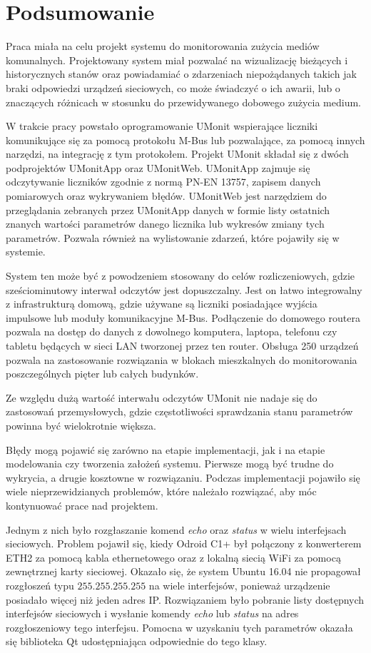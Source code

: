 \chapter{Podsumowanie} %
\label{cha:podsumowanie}

Praca miała na celu projekt systemu do monitorowania zużycia mediów komunalnych.
Projektowany system miał pozwalać na wizualizację bieżących i historycznych stanów oraz powiadamiać o zdarzeniach niepożądanych takich jak braki odpowiedzi urządzeń sieciowych, co może świadczyć o ich awarii, lub o znaczących różnicach w stosunku do przewidywanego dobowego zużycia medium.

W trakcie pracy powstało oprogramowanie UMonit wspierające liczniki komunikujące się za pomocą protokołu M-Bus lub pozwalające, za pomocą innych narzędzi, na integrację z tym protokołem.
Projekt UMonit składał się z dwóch podprojektów UMonitApp oraz UMonitWeb.
UMonitApp zajmuje się odczytywanie liczników zgodnie z normą PN-EN 13757, zapisem danych pomiarowych oraz wykrywaniem błędów.
UMonitWeb jest narzędziem do przeglądania zebranych przez UMonitApp danych w formie listy ostatnich znanych wartości parametrów danego licznika lub wykresów zmiany tych parametrów.
Pozwala również na wylistowanie zdarzeń, które pojawiły się w systemie.

System ten może być z powodzeniem stosowany do celów rozliczeniowych, gdzie sześciominutowy interwał odczytów jest dopuszczalny.
Jest on łatwo integrowalny z infrastrukturą domową, gdzie używane są liczniki posiadające wyjścia impulsowe lub moduły komunikacyjne M-Bus.
Podłączenie do domowego routera pozwala na dostęp do danych z dowolnego komputera, laptopa, telefonu czy tabletu będących w sieci LAN tworzonej przez ten router.
Obsługa 250 urządzeń pozwala na zastosowanie rozwiązania w blokach mieszkalnych do monitorowania poszczególnych pięter lub całych budynków.

Ze względu dużą wartość interwału odczytów UMonit nie nadaje się do zastosowań przemysłowych, gdzie częstotliwości sprawdzania stanu parametrów powinna być wielokrotnie większa.

Błędy mogą pojawić się zarówno na etapie implementacji, jak i na etapie modelowania czy tworzenia założeń systemu.
Pierwsze mogą być trudne do wykrycia, a drugie kosztowne w rozwiązaniu.
Podczas implementacji pojawiło się wiele nieprzewidzianych problemów, które należało rozwiązać, aby móc kontynuować prace nad projektem.

Jednym z nich było rozgłaszanie komend \textit{echo} oraz \textit{status} w wielu interfejsach sieciowych.
Problem pojawił się, kiedy Odroid C1+ był połączony z konwerterem ETH2 za pomocą kabla ethernetowego oraz z lokalną siecią WiFi za pomocą zewnętrznej karty sieciowej.
Okazało się, że system Ubuntu 16.04 nie propagował rozgłoszeń typu $ 255.255.255.255 $ na wiele interfejsów, ponieważ urządzenie posiadało więcej niż jeden adres IP.
Rozwiązaniem było pobranie listy dostępnych interfejsów sieciowych i wysłanie komendy \textit{echo} lub \textit{status} na adres rozgłoszeniowy tego interfejsu.
Pomocna w uzyskaniu tych parametrów okazała się biblioteka Qt udostępniająca odpowiednie do tego klasy.

